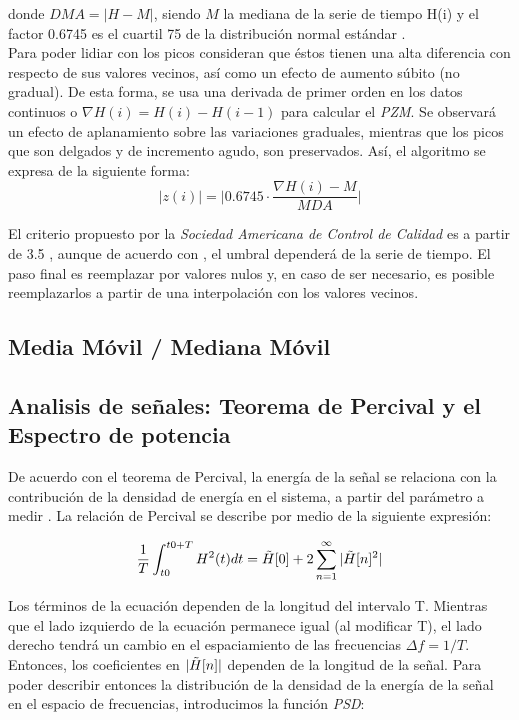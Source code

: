 \documentclass[preprint,12pt]{article}
\begin{document}
donde $DMA = |H-M|$, siendo $M$ la mediana de la serie de tiempo H(i) y el factor 0.6745 es el cuartil 75 de la distribución normal estándar \cite{removing_with_Whitaker-Hayes}.\\

Para poder lidiar con los picos \cite{WHITAKER2018, removing_with_Whitaker-Hayes} consideran que éstos tienen una alta diferencia con respecto de sus valores vecinos, así como un efecto de aumento súbito (no gradual). De esta forma, se usa una derivada de primer orden en los datos continuos o $\nabla H(i) = H(i)- H(i-1)$ para calcular el \emph{PZM}. Se observará un efecto de aplanamiento sobre las variaciones graduales, mientras que los picos que son delgados y de incremento agudo, son preservados. Así, el algoritmo se expresa de la siguiente forma:
\begin{equation}
	\lvert z(i)\rvert = \bigg| 0.6745 \cdot \frac{\nabla H(i) - M}{MDA}\bigg|
\end{equation}

El criterio propuesto por la \emph{Sociedad Americana de Control de Calidad} es a partir de 3.5 , aunque de acuerdo con \cite{removing_with_Whitaker-Hayes}, el umbral dependerá de la serie de tiempo. El paso final es reemplazar por valores nulos y, en caso de ser necesario, es posible reemplazarlos a partir de una interpolación con los valores vecinos.

\subsection{Media Móvil / Mediana Móvil}


\subsection{Analisis de señales: Teorema de Percival y el Espectro de potencia}
\label{psd_section}
De acuerdo con el teorema de Percival, la energía de la señal se relaciona con la contribución de la densidad de energía en el sistema, a partir del parámetro a medir \cite{book_analysis_Method_multiSp_data}. La relación de Percival se describe por medio de la siguiente expresión: 

\begin{equation}
	\frac{1}{T} \int_{t0}^{t0+T} H^2(t)dt = \Tilde{H}[0] + 2 \sum_{n=1}^\infty |\Tilde{H}[n]^2|
\end{equation}

Los términos de la ecuación dependen de la longitud del intervalo T. Mientras que el lado izquierdo de la ecuación permanece igual (al modificar T), el lado derecho tendrá un cambio en el espaciamiento de las frecuencias $\Delta f = 1/T$. Entonces, los coeficientes en $|\Tilde{H}[n]|$ dependen de la longitud de la señal. Para poder describir entonces la distribución de la densidad de la energía de la señal en el espacio de frecuencias, introducimos la función \emph{PSD}:
\end{document}
